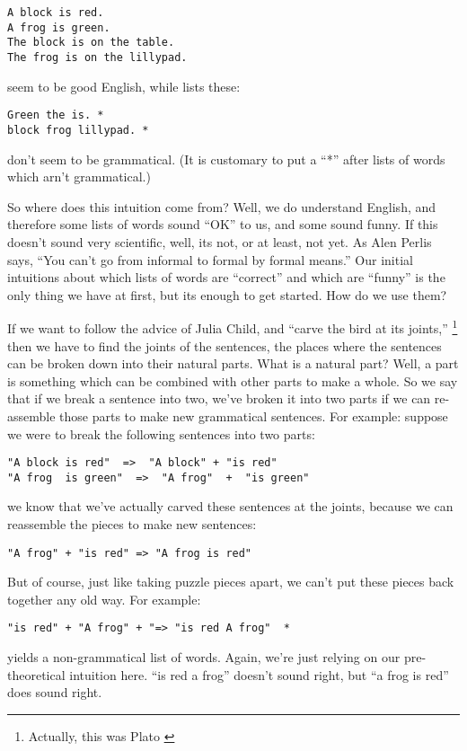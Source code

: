 \documentclass{book}[9pt]
\begin{document}
\begin{verbatim}
A block is red.
A frog is green.
The block is on the table.
The frog is on the lillypad.
\end{verbatim}
\noindent seem to be good English, while lists these:
\begin{verbatim}
Green the is. *
block frog lillypad. *
\end{verbatim}
\noindent don't seem to be grammatical.  (It is customary to put a
``*'' after lists of words which arn't grammatical.)

So where does this intuition come from?  Well, we do understand
English, and therefore some lists of words sound ``OK'' to us, and
some sound funny.  If this doesn't sound very scientific, well, its
not, or at least, not yet.  As Alen Perlis says, ``You can't go from
informal to formal by formal means.''  Our initial intuitions about
which lists of words are ``correct'' and which are ``funny'' is the only
thing we have at first, but its enough to get started.  How do we use
them?

If we want to follow the advice of Julia Child, and ``carve the bird
at its joints,'' \footnote{Actually, this was Plato \cite{plato400bc}}
then we have to find the joints of the sentences, the places where the
sentences can be broken down into their natural parts.  What is a natural
part?  Well, a part is something which can be combined with other
parts to make a whole.  So we say that if we break a sentence into
two, we've broken it into two parts if we can re-assemble those parts
to make new grammatical sentences.  For example: suppose we were to
break the following sentences into two parts:

\begin{verbatim}
"A block is red"  =>  "A block" + "is red"
"A frog  is green"  =>  "A frog"  +  "is green"
\end{verbatim}

\noindent we know that we've actually carved these sentences at the
joints, because we can reassemble the pieces to make new
sentences:

\begin{verbatim}
"A frog" + "is red" => "A frog is red"
\end{verbatim}

But of course, just like taking puzzle pieces apart, we can't put
these pieces back together any old way.  For example:
\begin{verbatim}
"is red" + "A frog" + "=> "is red A frog"  *
\end{verbatim}
\noindent yields a non-grammatical list of words.  Again, we're just
relying on our pre-theoretical intuition here.  ``is red a frog''
doesn't sound right, but ``a frog is red'' does sound right.
\end{document}
